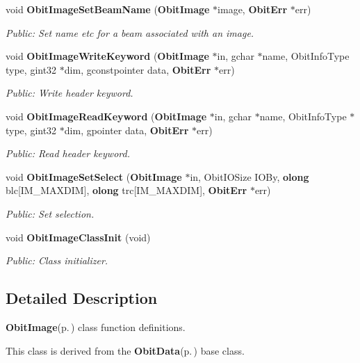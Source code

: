 \begin{CompactItemize}
void {\bf Obit\-Image\-Set\-Beam\-Name} ({\bf Obit\-Image} $\ast$image, {\bf Obit\-Err} $\ast$err)
\begin{CompactList}\small\item\em Public: Set name etc for a beam associated with an image. \item\end{CompactList}\item 
void {\bf Obit\-Image\-Write\-Keyword} ({\bf Obit\-Image} $\ast$in, gchar $\ast$name, Obit\-Info\-Type type, gint32 $\ast$dim, gconstpointer data, {\bf Obit\-Err} $\ast$err)
\begin{CompactList}\small\item\em Public: Write header keyword. \item\end{CompactList}\item 
void {\bf Obit\-Image\-Read\-Keyword} ({\bf Obit\-Image} $\ast$in, gchar $\ast$name, Obit\-Info\-Type $\ast$type, gint32 $\ast$dim, gpointer data, {\bf Obit\-Err} $\ast$err)
\begin{CompactList}\small\item\em Public: Read header keyword. \item\end{CompactList}\item 
void {\bf Obit\-Image\-Set\-Select} ({\bf Obit\-Image} $\ast$in, Obit\-IOSize IOBy, {\bf olong} blc[IM\_\-MAXDIM], {\bf olong} trc[IM\_\-MAXDIM], {\bf Obit\-Err} $\ast$err)
\begin{CompactList}\small\item\em Public: Set selection. \item\end{CompactList}\item 
void {\bf Obit\-Image\-Class\-Init} (void)
\begin{CompactList}\small\item\em Public: Class initializer. \item\end{CompactList}\end{CompactItemize}


\subsection{Detailed Description}
{\bf Obit\-Image}{\rm (p.\,\pageref{structObitImage})} class function definitions. 

This class is derived from the {\bf Obit\-Data}{\rm (p.\,\pageref{structObitData})} base class.

